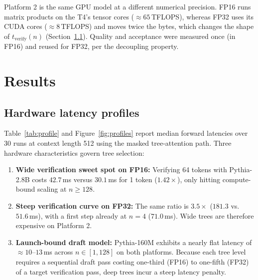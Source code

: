 \documentclass[10pt]{article}
\begin{document}
Platform 2 is the same GPU model at a different numerical precision. FP16 runs matrix products on the T4's tensor cores ($\approx 65$\,TFLOPS), whereas FP32 uses its CUDA cores ($\approx 8$\,TFLOPS) and moves twice the bytes, which changes the shape of $t_{\mathrm{verify}}(n)$ (Section~\ref{sec:profile}). Quality and acceptance were measured once (in FP16) and reused for FP32, per the decoupling property.

\section{Results}

\subsection{Hardware latency profiles}
\label{sec:profile}
Table~\ref{tab:profile} and Figure~\ref{fig:profiles} report median forward latencies over 30 runs at context length 512 using the masked tree-attention path. Three hardware characteristics govern tree selection:
\begin{enumerate}
    \item \textbf{Wide verification sweet spot on FP16:} Verifying 64 tokens with Pythia-2.8B costs $42.7$\,ms versus $30.1$\,ms for 1 token ($1.42\times$), only hitting compute-bound scaling at $n \ge 128$.
    \item \textbf{Steep verification curve on FP32:} The same ratio is $3.5\times$ ($181.3$ vs.\ $51.6$\,ms), with a first step already at $n = 4$ ($71.0$\,ms). Wide trees are therefore expensive on Platform 2.
    \item \textbf{Launch-bound draft model:} Pythia-160M exhibits a nearly flat latency of $\approx 10$--$13$\,ms across $n \in [1, 128]$ on both platforms. Because each tree level requires a sequential draft pass costing one-third (FP16) to one-fifth (FP32) of a target verification pass, deep trees incur a steep latency penalty.
\end{enumerate}
\end{document}
